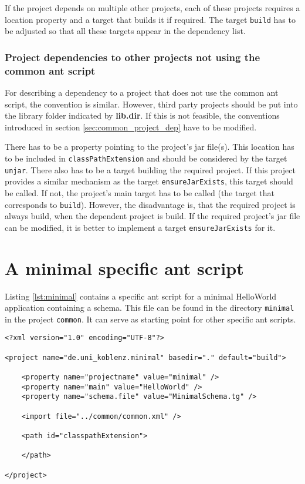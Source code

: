 \documentclass[a4paper,twoside,11pt,bibtotoc]{article}
\begin{document}
If the project depends on multiple other projects, each of these projects requires a location property and a target that builds it if required.
The target \texttt{build} has to be adjusted so that all these targets appear in the dependency list.

\subsubsection{Project dependencies to other projects not using the common ant script}
\label{sec:arbitrary_project_dep}
For describing a dependency to a project that does not use the common ant script, the convention is similar.
However, third party projects should be put into the library folder indicated by \textbf{lib.dir}.
If this is not feasible, the conventions introduced in section \ref{sec:common_project_dep} have to be modified.

There has to be a property pointing to the project's jar file(s).
This location has to be included in \texttt{classPathExtension} and should be considered by the target \texttt{unjar}.
There also has to be a target building the required project.
If this project provides a similar mechanism as the target \texttt{ensureJarExists}, this target should be called.
If not, the project's main target has to be called (the target that corresponds to \texttt{build}).
However, the disadvantage is, that the required project is always build, when the dependent project is build.
If the required project's jar file can be modified, it is better to implement a target \texttt{ensureJarExists} for it.

\clearpage

\appendix
\section{A minimal specific ant script}
Listing \ref{lst:minimal} contains a specific ant script for a minimal HelloWorld application containing a schema.
This file can be found in the directory \texttt{minimal} in the project \texttt{common}.
It can serve as starting point for other specific ant scripts.

\begin{lstlisting}[caption=Minimal specific ant script,label=lst:minimal,float=!ht,language=ant]
<?xml version="1.0" encoding="UTF-8"?>

<project name="de.uni_koblenz.minimal" basedir="." default="build">
	
	<property name="projectname" value="minimal" />
	<property name="main" value="HelloWorld" />
	<property name="schema.file" value="MinimalSchema.tg" />
	
	<import file="../common/common.xml" />
	
	<path id="classpathExtension">
		
	</path>
	
</project>
\end{lstlisting}
\end{document}
